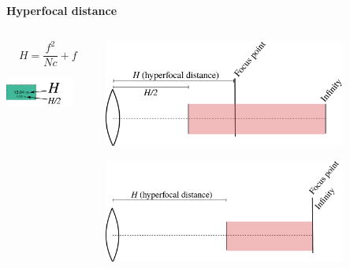 \documentclass[aspectratio=169]{beamer}
\begin{document}
\begin{frame}[plain]{}
  \vspace{3ex}
  \begin{center} \LARGE \bf
    Hyperfocal distance
  \end{center}

  \begin{columns}
  \begin{column}{0.40\textwidth}
    { \Large
      $$\mathit{H = \frac{f^2}{Nc} + f}$$
    }

    \center
    \includegraphics[width=0.80\textwidth]{img/hyperfocal-distance-example-cell.pdf}
  \end{column}
  \begin{column}{0.60\textwidth}
    \includegraphics[width=0.80\textwidth]{img/lensfocus-hyperfocal-1.pdf}

    \includegraphics[width=0.80\textwidth]{img/lensfocus-hyperfocal-2.pdf}
  \end{column}
  \end{columns}

\end{frame}
\end{document}
